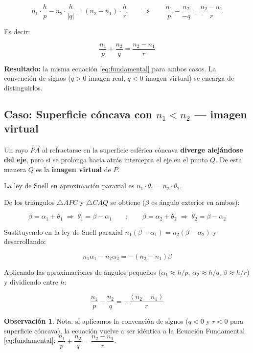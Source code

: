 \documentclass[12pt, a4paper]{article}
\theoremstyle{definition}
\newtheorem{observacion}{Observación}[section]
\begin{document}
\[
  n_1 \cdot \frac{h}{p} - n_2 \cdot \frac{h}{|q|} = (n_2 - n_1) \cdot \frac{h}{r}
  \qquad \Longrightarrow \qquad
  \frac{n_1}{p} - \frac{n_2}{-q} = \frac{n_2 - n_1}{r}
\]

Es decir:

\begin{equation}
  \frac{n_1}{p} + \frac{n_2}{q} = \frac{n_2 - n_1}{r}
  \label{eq:fundamental_virtual}
\end{equation}

\textbf{Resultado:} la misma ecuación \eqref{eq:fundamental} para ambos casos. La
convención de signos (\(q > 0\) imagen real, \(q < 0\) imagen virtual) se encarga de
distinguirlos.

\subsection{Caso: Superficie cóncava con \texorpdfstring{\(n_1 < n_2\)}{n1 < n2}
            --- imagen virtual}

Un rayo \(\overrightarrow{PA}\) al refractarse en la superficie esférica cóncava
\textbf{diverge alejándose del eje}, pero si se prolonga hacia atrás intercepta el eje en
el punto \(Q\). De esta manera \(Q\) es la \textbf{imagen virtual} de \(P\).

La ley de Snell en aproximación paraxial es \(n_1 \cdot \theta_1 = n_2 \cdot \theta_2\).

De los triángulos \(\triangle APC\) y \(\triangle CAQ\) se obtiene (\(\beta\) es ángulo
exterior en ambos):

\[
  \beta = \alpha_1 + \theta_1 \;\Rightarrow\; \theta_1 = \beta - \alpha_1 \qquad;\qquad
  \beta = \alpha_2 + \theta_2 \;\Rightarrow\; \theta_2 = \beta - \alpha_2
\]

Sustituyendo en la ley de Snell paraxial \(n_1(\beta - \alpha_1) = n_2(\beta - \alpha_2)\)
y desarrollando:

\[
  n_1\alpha_1 - n_2\alpha_2 = -(n_2 - n_1)\beta
\]

Aplicando las aproximaciones de ángulos pequeños
(\(\alpha_1 \approx h/p\), \(\alpha_2 \approx h/q\), \(\beta \approx h/r\)) y dividiendo
entre \(h\):

\begin{equation}
  \frac{n_1}{p} - \frac{n_2}{q} = -\frac{(n_2 - n_1)}{r}
  \label{eq:concava_n1menor}
\end{equation}

\begin{observacion}
Nota: si aplicamos la convención de signos (\(q < 0\) y \(r < 0\) para superficie cóncava),
la ecuación vuelve a ser idéntica a la Ecuación Fundamental \eqref{eq:fundamental}:
\(\dfrac{n_1}{p} + \dfrac{n_2}{q} = \dfrac{n_2-n_1}{r}\).
\end{observacion}
\end{document}
